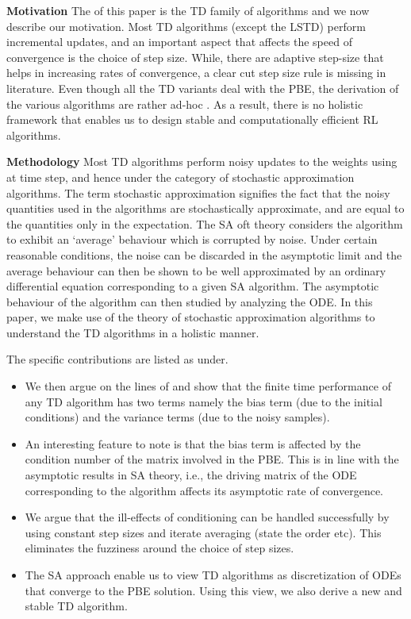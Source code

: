 \textbf{Motivation} The of this paper is the TD family of algorithms and we now describe our motivation. Most TD algorithms (except the LSTD) perform incremental updates, and an important aspect that affects the speed of convergence is the choice of step size. While, there are adaptive step-size that helps in increasing rates of convergence, a clear cut step size rule is missing in literature. Even though all the TD variants deal with the PBE, the derivation of the various algorithms are rather ad-hoc \cite{}. As a result, there is no holistic framework that enables us to design stable and computationally efficient RL algorithms.\par
\textbf{Methodology} Most TD algorithms perform noisy updates to the weights using at time step, and hence under the category of stochastic approximation algorithms. The term stochastic approximation signifies the fact that the noisy quantities used in the algorithms are stochastically approximate, and are equal to the quantities only in the expectation. The SA oft theory considers the algorithm to exhibit an `average’ behaviour which is corrupted by noise. Under certain reasonable conditions, the noise can be discarded in the asymptotic limit and the average behaviour can then be shown to be well approximated by an ordinary differential equation corresponding to a given SA algorithm. The asymptotic behaviour of the algorithm can then studied by analyzing the ODE. In this paper, we make use of the theory of stochastic approximation algorithms to understand the TD algorithms in a holistic manner.\par
The specific contributions are listed as under.
\begin{itemize} 
\item We then argue on the lines of \cite{} and show that the finite time performance of any TD algorithm has two terms namely the bias term (due to the initial conditions) and the variance terms (due to the noisy samples). 
\item An interesting feature to note is that the bias term is affected by the condition number of the matrix involved in the PBE. This is in line with the asymptotic results in SA theory, i.e., the driving matrix of the ODE corresponding to the algorithm affects its asymptotic rate of convergence. 
\item We argue that the ill-effects of conditioning can be handled successfully by using constant step sizes and iterate averaging (state the order etc). This eliminates the fuzziness around the choice of step sizes.
\item The SA approach enable us to view TD algorithms as discretization of ODEs that converge to the PBE solution. Using this view, we also derive a new and stable TD algorithm.
\end{itemize}
